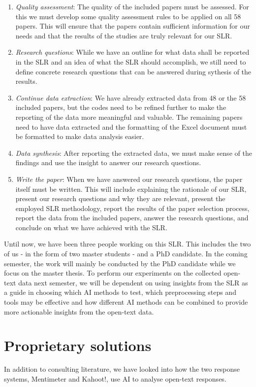\begin{enumerate}
    \item \textit{Quality assessment}: The quality of the included papers must be assessed. For this we must develop some quality assessment rules to be applied on all 58 papers. This will ensure that the papers contain sufficient information for our needs and that the results of the studies are truly relevant for our SLR.
    \item \textit{Research questions}: While we have an outline for what data shall be reported in the SLR and an idea of what the SLR should accomplish, we still need to define concrete research questions that can be answered during sythesis of the results.
    \item \textit{Continue data extraction}: We have already extracted data from 48 or the 
    58 included papers, but the codes need to be refined further to make the reporting of the data more meaningful and valuable. The remaining papers need to have data extracted and the formatting of the Excel document must be formatted to make data analysis easier.
    \item \textit{Data synthesis}: After reporting the extracted data, we must make sense of the findings and use the insight to answer our research questions.
    \item \textit{Write the paper}: When we have answered our research questions, the paper itself must be written. This will include explaining the rationale of our SLR, present our research questions and why they are relevant, present the employed SLR methodology, report the results of the paper selection process, report the data from the included papers, answer the research questions, and conclude on what we have achieved with the SLR.
\end{enumerate}

Until now, we have been three people working on this SLR. This includes the two of us - in the form of two master students - and a PhD candidate. In the coming semester, the work will mainly be conducted by the PhD candidate while we focus on the master thesis. To perform our experiments on the collected open-text data next semester, we will be dependent on using insights from the SLR as a guide in choosing which AI methods to test, which preprocessing steps and tools may be effective and how different AI methods can be combined to provide more actionable insights from the open-text data.

\section{Proprietary solutions}
In addition to consulting literature, we have looked into how the two response systems, Mentimeter and Kahoot!, use AI to analyse open-text responses.

